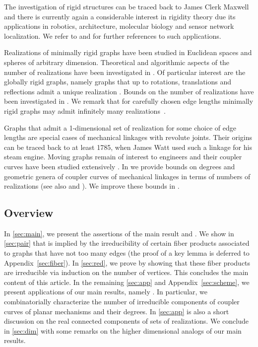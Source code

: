 \documentclass[12pt]{article}
\theoremstyle{definition}
\newcommand{\APP}[1]{Appendix~\ref{sec:#1}}
\newcommand{\SEC}[1]{\textsection\ref{sec:#1}}
\begin{document}
The investigation of rigid structures can be traced back to
James Clerk Maxwell~\cite{1864} and there is currently again a considerable interest in rigidity
theory due its applications in
robotics, architecture, molecular biology and sensor network localization.
We refer to \cite{2002} and \citep[Introduction]{2022-ub} for further references to such applications.

Realizations of minimally rigid graphs have been studied
in Euclidean spaces and spheres of arbitrary dimension.
Theoretical and algorithmic aspects of the number of realizations
have been investigated in \cite{2021-iso,2019,2018-num,2023-cal,2023-sphere}.
Of particular interest are the globally rigid graphs, namely graphs
that up to rotations, translations and reflections admit a unique realization \cite{2005,2023-glob}.
Bounds on the number of realizations have been investigated in
\cite{2004,2022-ub,2021-real,2020-low,2010,2023-dewar}.
We remark that for carefully chosen edge lengths minimally rigid
graphs may admit infinitely many realizations~\cite{2022-yet}.

Graphs that admit a 1-dimensional set of
realization for some choice of edge lengths
are special cases of mechanical linkages with revolute joints.
Their origins can be traced back to at least 1785,
when James Watt used such a linkage for his steam engine.
Moving graphs remain of interest to engineers
and their coupler curves have been studied extensively \cite{1990}.
In \cite{2023-cal} we provide bounds on degrees and geometric genera
of coupler curves of mechanical linkages in terms of numbers of realizations
(see also \cite{1963} and \citep[Figure~5]{2004}).
We improve these bounds in .


\subsection*{Overview}

In \SEC{main}, we present the assertions of the main result 
and .
We show in \SEC{pair} that  is implied
by the irreducibility of certain fiber products associated to graphs
that have not too many edges (the proof of a key lemma is deferred to \APP{fiber}).
In \SEC{red}, we prove 
by showing that these fiber products are irreducible
via induction on the number of vertices.
This concludes the main content of this article.
In the remaining \SEC{app} and \APP{scheme},
we present applications of our main results, namely .
In particular, we combinatorially characterize
the number of irreducible components of coupler curves of planar mechanisms
and their degrees.
In \SEC{app} is also a short discussion on the real connected components
of sets of realizations.
We conclude in \SEC{dim} with some remarks on the higher dimensional analogs of our main results.
\end{document}
